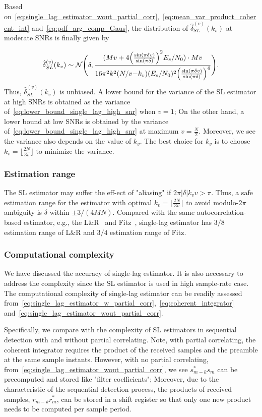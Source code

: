 Based on~\eqref{eq:single_lag_estimator_wout_partial_corr},~\eqref{eq:mean_var_product_coherent_int}
and~\eqref{eq:pdf_arg_comp_Gaus}, the distribution of $\hat{\delta}_{SL}^{(v)}(k_v)$ at moderate SNRs is finally given by

\begin{equation}
  \label{eq:lower_bound_single_lag_high_snr}
  \hat{\delta}_{SL}^{(v)}(k_v) \sim \mathcal{N} \Bigg(\delta,\frac{(Mv+4\Big(\frac{\sin(\pi \delta v)}{\sin(\pi \delta)}\Big)^2E_s/N_0)\cdot Mv}{16\pi^2k^2(N/v{-}k_v)(E_s/N_0)^2\Big(\frac{\sin(\pi \delta v)}{\sin(\pi \delta)}\Big)^4}\Bigg).
\end{equation}
Thus, $\hat{\delta}_{SL}^{(v)}(k_v)$ is unbiased. 
A lower bound for the variance of the SL estimator at high SNRs is obtained
as the variance of~\eqref{eq:lower_bound_single_lag_high_snr} when $v=1$;
On the other hand, a lower bound at low SNRs is obtained by the variance of~\eqref{eq:lower_bound_single_lag_high_snr}
at maximum $v=\frac{N}{2}$.
Moreover, we see the variance also depends on
the value of $k_v$. The best choice for $k_v$ is to choose 
$k_v=\lfloor\frac{2N}{3v}\rfloor$ to minimize the variance.

\subsubsection{Estimation range}
The SL estimator may suffer the eff-ect
of "aliasing" if $2\pi |\delta|k_vv{>}\pi$. Thus, a safe estimation range for the estimator with optimal $k_v=\lfloor\frac{2N}{3v}\rfloor$ to avoid modulo-$2\pi$ ambiguity
is $\delta$ within $\pm 3/(4MN)$. Compared with the same autocorrelation-based estimator, e.g.,
the L\&R~\cite{Luise_Reggiannini_95} and Fitz~\cite{Fitz_94}, single-lag estimator has 
$3/8$ estimation range of L\&R and $3/4$ estimation range of Fitz.

\subsubsection{Computational complexity}

We have discussed the accuracy of single-lag estimator.
It is also necessary to address the complexity since the SL estimator
is used in high sample-rate case. The computational complexity of single-lag estimator 
can be readily assessed from~\eqref{eq:single_lag_estimator_w_partial_corr},~\eqref{eq:coherent_integrator} and~\eqref{eq:single_lag_estimator_wout_partial_corr}.

Specifically, we compare with the complexity of SL estimators in sequential detection with and without partial correlating.
Note, with partial correlating, the
coherent integrator requires the product of the received samples and the preamble 
at the same sample instants. However, with no partial correlating, from~\eqref{eq:single_lag_estimator_wout_partial_corr},
we see $s_{m-k}^*s_m$ can be precomputed and stored
like "filter coefficients"; Moreover, due to the characteristic of the sequential detection process, the products of received samples, $r_{m-k}r_m^*$,
can be stored in a shift register so that only one new product needs to be computed per sample period.

